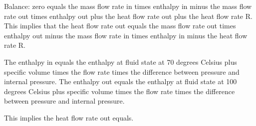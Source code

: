 Balance: zero equals the mass flow rate in times enthalpy in minus the mass flow rate out times enthalpy out plus the heat flow rate out plus the heat flow rate R. This implies that the heat flow rate out equals the mass flow rate out times enthalpy out minus the mass flow rate in times enthalpy in minus the heat flow rate R.

The enthalpy in equals the enthalpy at fluid state at 70 degrees Celsius plus specific volume times the flow rate times the difference between pressure and internal pressure. The enthalpy out equals the enthalpy at fluid state at 100 degrees Celsius plus specific volume times the flow rate times the difference between pressure and internal pressure.

This implies the heat flow rate out equals.